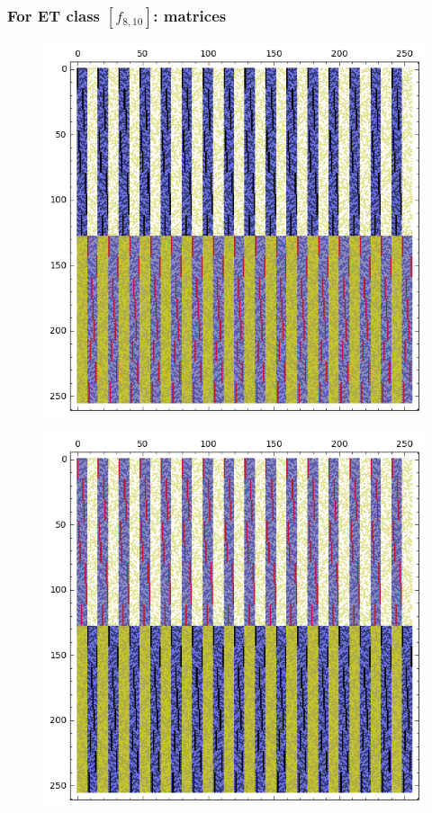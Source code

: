 \documentclass[pdf,sprung,slideColor,nocolorBG]{beamer}
\begin{document}
\begin{frame}
\frametitle{For ET class $[f_{8,10}]$: matrices}
\begin{figure}
\centering
\begin{minipage}{.48\textwidth}
  \centering
  \includegraphics[width=.9\linewidth]{../matrix_plot/c8_10_bent_cayley_graph_index_matrix.png}
  \label{fig:c8_10_bent_cayley_graph_index_matrix}
\end{minipage}
\begin{minipage}{.48\textwidth}
  \centering
  \includegraphics[width=.9\linewidth]{../matrix_plot/c8_10_dual_cayley_graph_index_matrix.png}
  \label{fig:c8_10_dual_cayley_graph_index_matrix}
\end{minipage}%
\end{figure}
\end{frame}
\end{document}
